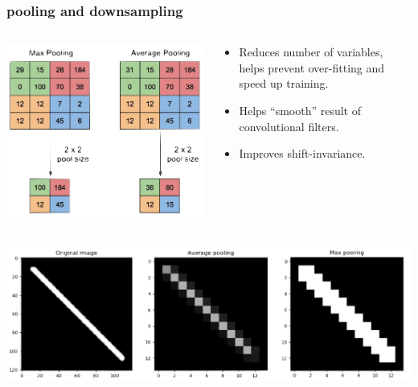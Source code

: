 \documentclass[handout,compress]{beamer}
\begin{document}
	\begin{frame}
	\frametitle{pooling and downsampling}
	\small
	\begin{columns}
		\begin{column}{.5\textwidth}
			\includegraphics[width=\textwidth]{pooling_basic.png}
		\end{column}
	\begin{column}{.5\textwidth}
		\begin{itemize}
			\item Reduces number of variables, helps prevent over-fitting and speed up training.
			\item Helps ``smooth'' result of convolutional filters.
			\item Improves shift-invariance.
		\end{itemize}
	\end{column}
	\end{columns}
	\begin{center}
		\includegraphics[width=.6\textwidth]{effect_of_max_pooling.png}
	\end{center}
	\end{frame}
\end{document}
